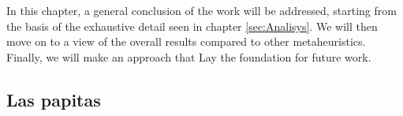 In this chapter, a general conclusion of the work will be addressed, starting from the basis of the exhaustive detail seen in chapter \ref{sec:Analisys}.
We will then move on to a view of the overall results compared to other metaheuristics. Finally, we will make an approach that
Lay the foundation for future work.

\subsection{Las papitas}